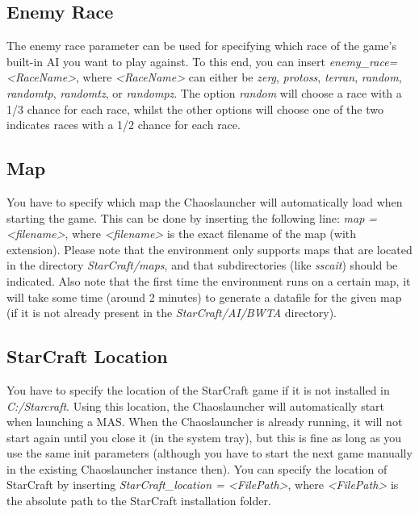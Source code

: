 \subsection{Enemy Race}
\label{enemy race}
The enemy race parameter can be used for specifying which race of the game's built-in AI you want to play against. To this end, you can insert \textit{enemy\_race=<RaceName>}, where \textit{<RaceName>} can either be \textit{zerg}, \textit{protoss}, \textit{terran}, \textit{random}, \textit{randomtp}, \textit{randomtz}, or \textit{randompz}. The option \textit{random} will choose a race with a 1/3 chance for each race, whilst the other options will choose one of the two indicates races with a 1/2 chance for each race.

\subsection{Map}
\label{map}
You have to specify which map the Chaoslauncher will automatically load when starting the game. This can be done by inserting the following line: \textit{map = <filename>}, where \textit{<filename>} is the exact filename of the map (with extension). Please note that the environment only supports maps that are located in the directory \textit{StarCraft/maps}, and that subdirectories (like \textit{sscait}) should be indicated. Also note that the first time the environment runs on a certain map, it will take some time (around 2 minutes) to generate a datafile for the given map (if it is not already present in the \textit{StarCraft/AI/BWTA} directory).

\pagebreak
\subsection{StarCraft Location}
\label{StarCraft location}
You have to specify the location of the StarCraft game if it is not installed in \textit{C:/Starcraft}. Using this location, the Chaoslauncher will automatically start when launching a MAS. When the Chaoslauncher is already running, it will not start again until you close it (in the system tray), but this is fine as long as you use the same init parameters (although you have to start the next game manually in the existing Chaoslauncher instance then). You can specify the location of StarCraft by inserting \textit{StarCraft\_location = <FilePath>}, where \textit{<FilePath>} is the absolute path to the StarCraft installation folder.

